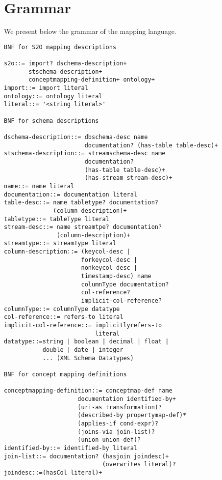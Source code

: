 \section{\bigstwoo Grammar}
\label{sec:appendixStwoo}
%
We present below the grammar of the \stwoo mapping language.

\begin{lstlisting}[style=BNFStyle,language=BNF,label=list:schema,caption=Grammar of the \stwoo mapping language.]
BNF for S2O mapping descriptions

s2o::= import? dschema-description+ 
       stschema-description+ 
       conceptmapping-definition+ ontology+
import::= import literal
ontology::= ontology literal
literal::= '<string literal>'

BNF for schema descriptions

dschema-description::= dbschema-desc name 
                       documentation? (has-table table-desc)+ 
stschema-description::= streamschema-desc name 
                       documentation? 
                       (has-table table-desc)+
                       (has-stream stream-desc)+
name::= name literal
documentation::= documentation literal
table-desc::= name tabletype? documentation? 
              (column-description)+
tabletype::= tableType literal
stream-desc::= name streamtpe? documentation? 
               (column-description)+
streamtype::= streamType literal
column-description::= (keycol-desc |
                      forkeycol-desc | 
                      nonkeycol-desc | 
                      timestamp-desc) name 
                      columnType documentation? 
                      col-reference? 
                      implicit-col-reference?
columnType::= columnType datatype
col-reference::= refers-to literal
implicit-col-reference::= implicitlyrefers-to 
                          literal
datatype::=string | boolean | decimal | float | 
           double | date | integer 
           ... (XML Schema Datatypes)

BNF for concept mapping definitions

conceptmapping-definition::= conceptmap-def name 
                     documentation identified-by+ 
                     (uri-as transformation)? 
                     (described-by propertymap-def)* 
                     (applies-if cond-expr)? 
                     (joins-via join-list)? 
                     (union union-def)?
identified-by::= identified-by literal
join-list::= documentation? (hasjoin joindesc)+ 
                            (overwrites literal)?
joindesc::=(hasCol literal)+


\end{lstlisting}
